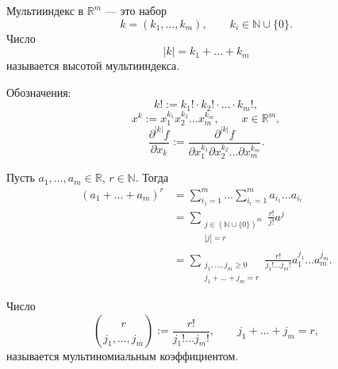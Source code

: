 \label{ticket:02}

\begin{definition}
Мультииндекс в $\mathbb R^m$ --- это набор
\[
  k=(k_1,\ldots,k_m),\qquad k_i\in\mathbb N\cup\{0\}.
\]
Число
\[
  |k|=k_1+\ldots+k_m
\]
называется высотой мультииндекса.

Обозначения:
\[
  k!:=k_1!\cdot k_2!\cdot\ldots\cdot k_m!,
\]
\[
  x^k:=x_1^{k_1}x_2^{k_2}\ldots x_m^{k_m},
  \qquad x\in\mathbb R^m,
\]
\[
  \frac{\partial^{|k|}f}{\partial x_k}
  :=\frac{\partial^{|k|}f}
  {\partial x_1^{k_1}\partial x_2^{k_2}\ldots\partial x_m^{k_m}}.
\]
\end{definition}

\begin{lemma}
Пусть $a_1,\ldots,a_m\in\mathbb R$, $r\in\mathbb N$.
Тогда
\[
  \begin{aligned}
    (a_1+\ldots+a_m)^r
    &=\sum_{i_1=1}^{m}\ldots\sum_{i_r=1}^{m}a_{i_1}\ldots a_{i_r}\\
    &=\sum_{\substack{j\in(\mathbb N\cup\{0\})^m\\|j|=r}}
      \frac{r!}{j!}a^j\\
    &=\sum_{\substack{j_1,\ldots,j_m\ge0\\j_1+\ldots+j_m=r}}
      \frac{r!}{j_1!\ldots j_m!}a_1^{j_1}\ldots a_m^{j_m}.
  \end{aligned}
\]
\end{lemma}

Число
\[
  \binom{r}{j_1,\ldots,j_m}
  :=\frac{r!}{j_1!\ldots j_m!},
  \qquad j_1+\ldots+j_m=r,
\]
называется мультиномиальным коэффициентом.

